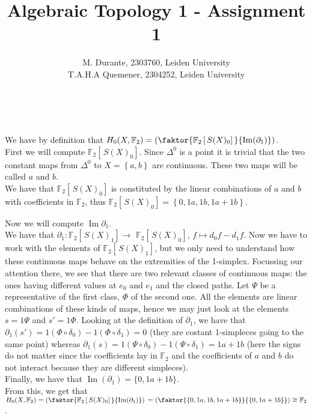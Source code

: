 \documentclass{article}
\newcommand{\numberset}{\mathbb}
\newcommand{\F}{\numberset{F}}
\DeclareMathOperator{\Ima}{Im}
\newcommand{\exercise}[1]{\noindent {\bf Exercise #1}}
\begin{document}
\title{Algebraic Topology 1 - Assignment 1}

\author{M. Durante, 2303760, Leiden University\\T.A.H.A Quemener, 2304252, Leiden University}

\maketitle


~\\
\exercise{1}

We have by definition that $H_0(X,\F_2)=\left(\faktor{\F_2\left[ \,S(X)_0\right]\,}{\Ima(\partial_1)}\right)$.\\
First we will compute $\F_2\left[ \,S(X)_0\right]$. Since $\Delta^0$ is a point it is trivial that the two constant maps from $\Delta^0$ to $X=\left\{ a,b \right\} $ are continuous. These two maps will be called $a$ and $b$.\\
We have that $\F_2\left[ \,S(X)_0\right]$ is constituted by the linear combinations of $a$ and $b$ with coefficients in $\F_2$, thus $\F_2\left[ \,S(X)_0\right]=\left\{0,1a,1b,1a+1b\right\}$.

Now we will compute $\Ima\partial_1$.\\
We have that $\partial_1: \F_2\left[ \,S(X)_1\right] \rightarrow$ $\F_2\left[ \,S(X)_0\right]$, $f\mapsto d_0f-d_1f$. Now we have to work with the elements of $\F_2\left[ \,S(X)_1\right]$, but we only need to understand how these continuous maps behave on the extremities of the 1-simplex.
Focussing our attention there, we see that there are two relevant classes of continuous maps: the ones having different values at $e_0$ and $e_1$ and the closed paths. Let $\Psi$ be a representative of the first class, $\Phi$ of the second one. All the elements are linear combinations of these kinds of maps, hence we may just look at the elements $s=1\Psi$ and $s'=1\Phi$.
Looking at the definition of $\partial_1$, we have that $\partial_1(s')=1(\Phi\circ\delta_0) - 1(\Phi\circ\delta_1)=0$ (they are costant 1-simpleces going to the same point) whereas $\partial_1(s)=1(\Psi\circ\delta_0) - 1(\Psi\circ\delta_1)=1a+1b$ (here the signs do not matter since the coefficients lay in $\F_2$ and the coefficients of $a$ and $b$ do not interact because they are different simpleces).\\
Finally, we have that $\Ima(\partial_1)=\{0,1a+1b\}$.\\
From this, we get that $H_0(X,\F_2)=\left(\faktor{\F_2\left[ \,S(X)_0\right]\,}{\Ima(\partial_1)}\right) \,= \left(\faktor{\left\{0,1a,1b, 1a+1b\right\}}{\{0,1a+1b\}}\right)\cong\F_2$.
\end{document}
